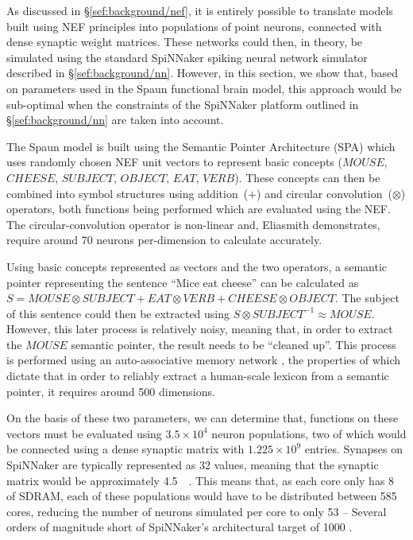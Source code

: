 \documentclass[conference]{IEEEtran}
\begin{document}
As discussed in \S\ref{sef:background/nef}, it is entirely possible to translate models built using NEF principles into populations of point neurons, connected with dense synaptic weight matrices. These networks could then, in theory, be simulated using the standard SpiNNaker spiking neural network simulator described in \S\ref{sef:background/nn}. However, in this section, we show that, based on parameters used in the Spaun functional brain model, this approach would be sub-optimal when the constraints of the SpiNNaker platform outlined in \S\ref{sef:background/nn} are taken into account.

The Spaun model is built using the Semantic Pointer Architecture (SPA) \parencite{eliasmith2013build} which uses randomly chosen NEF unit vectors to represent basic concepts ($MOUSE$, $CHEESE$, $SUBJECT$, $OBJECT$, $EAT$, $VERB$). These concepts can then be combined into symbol structures using addition~($+$) and circular convolution~($\otimes$) operators, both functions being performed which are evaluated using the NEF. The circular-convolution operator is non-linear and, Eliasmith \parencite{eliasmith2013build} demonstrates, require around 70 neurons per-dimension to calculate accurately.

Using basic concepts represented as vectors and the two operators, a semantic pointer representing the sentence ``Mice eat cheese'' can be calculated as $S=MOUSE \otimes SUBJECT + EAT \otimes VERB + CHEESE \otimes OBJECT$. The subject of this sentence could then be extracted using $S \otimes SUBJECT^{-1} \approx MOUSE$. However, this later process is relatively noisy, meaning that, in order to extract the $MOUSE$ semantic pointer, the result needs to be ``cleaned up''. This process is performed using an auto-associative memory network \parencite{Stewart2011}, the properties of which dictate that in order to reliably extract a human-scale lexicon from a semantic pointer, it requires around 500 dimensions.

On the basis of these two parameters, we can determine that, functions on these vectors must be evaluated using $3.5\times10^4$ neuron populations, two of which would be connected using a dense synaptic matrix with $1.225\times10^9$ entries. Synapses on SpiNNaker are typically represented as \SI{32}{\bit} values, meaning that the synaptic matrix would be approximately \SI{4.5}{\gibi\byte}. This means that, as each core only has \SI{8}{\mebi\byte} of SDRAM, each of these populations would have to be distributed between 585 cores, reducing the number of neurons simulated per core to only 53 -- Several orders of magnitude short of SpiNNaker's architectural target of 1000 \parencite{}. 
\end{document}
